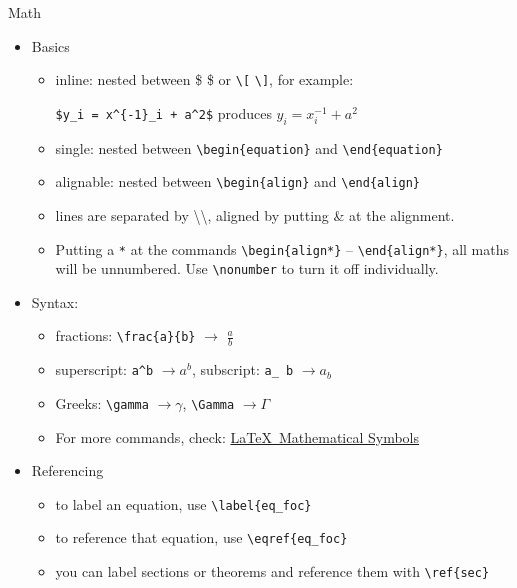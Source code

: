 \documentclass[
11pt, %
]{beamer}
\begin{document}
	\begin{frame}{Math}
		\begin{itemize}
			\item Basics
			\begin{itemize}
						\item inline: nested between \$ \$ or \texttt{\textbackslash [} \texttt{\textbackslash ]}, for example: 
						
						\texttt{\$y\_i = x\^{}\{-1\}\_i + a\^{}2\$} produces $y_i = x^{-1}_i + a^2$
						\item single: nested between \texttt{\textbackslash begin\{equation\}} and \texttt{\textbackslash end\{equation\}}
						\item alignable: nested between \texttt{\textbackslash begin\{align\}} and \texttt{\textbackslash end\{align\}}
						\item lines are separated by \textbackslash\textbackslash, aligned by putting \& at the alignment.
						\item Putting a \texttt{*} at the commands \texttt{\textbackslash begin\{align*\}} -- \texttt{\textbackslash end\{align*\}}, all maths will be unnumbered. Use \texttt{\textbackslash nonumber} to turn it off individually.
					\end{itemize} 
			\item Syntax:
			\begin{itemize}
				\item fractions: \texttt{\textbackslash frac\{a\}\{b\}} $\to$ $\frac{a}{b}$
				\item superscript: \texttt{a\^{}b} $\to a^b$, subscript: \texttt{a\_ b} $\to a_b$
				\item Greeks: \texttt{\textbackslash gamma} $\to \gamma$, \texttt{\textbackslash Gamma} $\to \Gamma$
				\item For more commands, check: \href{https://www.cmor-faculty.rice.edu/~heinken/latex/symbols.pdf}{\LaTeX \ Mathematical Symbols}
			\end{itemize}
			\item Referencing
			\begin{itemize}
				\item to label an equation, use \texttt{\textbackslash label\{eq\_foc\}}
				\item to reference that equation, use \texttt{\textbackslash eqref\{eq\_foc\}}
				\item you can label sections or theorems and reference them with \texttt{\textbackslash ref\{sec\}}
			\end{itemize}
		\end{itemize}
	\end{frame}
	
\end{document}
